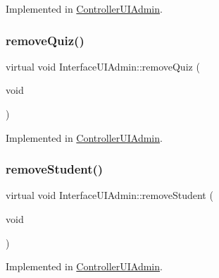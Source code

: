 Implemented in \hyperlink{class_controller_u_i_admin_a1e09e8b10c0f2261e307d9e9023daaa4}{Controller\+U\+I\+Admin}.

\mbox{\label{class_interface_u_i_admin_ae092dea900f7b2bc57cbf82b665df0ce}} 
\subsubsection{\texorpdfstring{remove\+Quiz()}{removeQuiz()}}
{\footnotesize\ttfamily virtual void Interface\+U\+I\+Admin\+::remove\+Quiz (\begin{DoxyParamCaption}\item[{void}]{ }\end{DoxyParamCaption})\hspace{0.3cm}{\ttfamily [pure virtual]}}



Implemented in \hyperlink{class_controller_u_i_admin_aeb774e2a137c65593cbe4c3ed22ffe64}{Controller\+U\+I\+Admin}.

\mbox{\label{class_interface_u_i_admin_af9fdde1936eaa0bf7950c4ca98d44d74}} 
\subsubsection{\texorpdfstring{remove\+Student()}{removeStudent()}}
{\footnotesize\ttfamily virtual void Interface\+U\+I\+Admin\+::remove\+Student (\begin{DoxyParamCaption}\item[{void}]{ }\end{DoxyParamCaption})\hspace{0.3cm}{\ttfamily [pure virtual]}}



Implemented in \hyperlink{class_controller_u_i_admin_a4487c7bf31acf5637e15e62af131b550}{Controller\+U\+I\+Admin}.

\mbox{\label{class_interface_u_i_admin_a812a7f43e1daaf95525e7c8b2b11676d}} 
